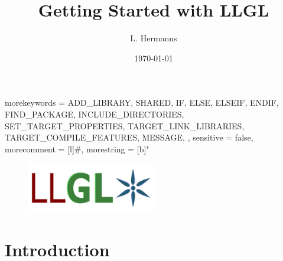 \documentclass{article}
\title{Getting Started with LLGL}
\author{L. Hermanns}
\date{\today}
\begin{document}

\def\LLGL{\textcolor{darkBlueColor}{LLGL}\xspace}


{
	morekeywords = {
		ADD_LIBRARY,
		SHARED,
		IF,
		ELSE,
		ELSEIF,
		ENDIF,
		FIND_PACKAGE,
		INCLUDE_DIRECTORIES,
		SET_TARGET_PROPERTIES,
		TARGET_LINK_LIBRARIES,
		TARGET_COMPILE_FEATURES,
		MESSAGE,
	},
	sensitive = false,
	morecomment = [l]{\#},
	morestring = [b]"
}

\maketitle

\begin{figure}[ht]
	\centering
	\includegraphics[width=0.5\textwidth]{../LLGL_Logo.pdf}
\end{figure}

\newpage



\tableofcontents

\newpage



\part{Introduction}


\end{document}
